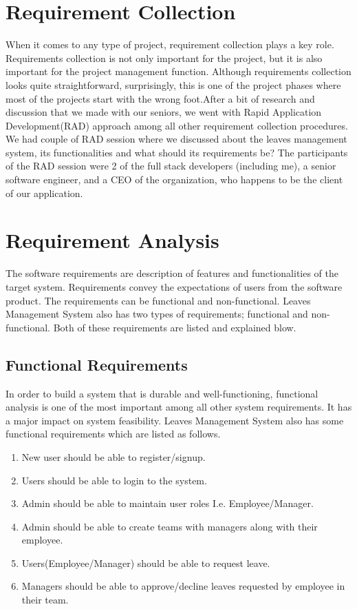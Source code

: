 \section{Requirement Collection}
\noindent
When it comes to any type of project, requirement collection plays a key role. Requirements
collection is not only important for the project, but it is also important for the project
management function. Although requirements collection looks quite straightforward,
surprisingly, this is one of the project phases where most of the projects start with the wrong
foot.After a bit of research and discussion that we made with our seniors, we went with Rapid Application Development(RAD) approach among all other requirement collection procedures. We had couple of RAD session where we discussed about the leaves management system, its functionalities and what should its requirements be? The participants of the RAD session were 2 of the full stack developers (including me), a senior software engineer, and a CEO of the organization, who happens to be the client of our application.

\section{Requirement Analysis}
The software requirements are description of features and functionalities of the target system.
Requirements convey the expectations of users from the software product. The requirements
can be functional and non-functional. Leaves Management System also has two types of
requirements; functional and non-functional. Both of these requirements are listed and explained
blow.

\subsection{Functional Requirements}
In order to build a system that is durable and well-functioning, functional analysis is one of
the most important among all other system requirements. It has a major impact on system
feasibility. Leaves Management System also has some functional requirements which are
listed as follows.

  \begin{enumerate}
  \item{New user should be able to register/signup.}
  \item{Users should be able to login to the system.}
  \item{Admin should be able to maintain user roles I.e. Employee/Manager.}
  \item{Admin should be able to create teams with managers along with their employee.}
  \item{Users(Employee/Manager) should be able to request leave.}
  \item{Managers should be able to approve/decline leaves requested by employee in their team.}
  \end{enumerate}

